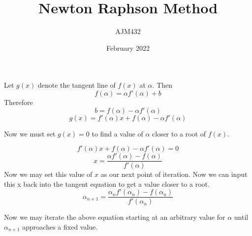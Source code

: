 \documentclass{article}
\title{Newton Raphson Method}
\author{AJM432}
\date{February 2022}
\begin{document}
\maketitle

Let $g(x)$ denote the tangent line of $f(x)$ at $\alpha$.
Then $$f(\alpha) = \alpha f'(\alpha) + b$$
Therefore $$b=f(\alpha)- \alpha f'(\alpha)$$
$$g(x)=f'(\alpha)x + f(\alpha)- \alpha f'(\alpha)$$

Now we must set $g(x)=0$ to find a value of $\alpha$ closer to a root of $f(x)$.

$$f'(\alpha)x + f(\alpha)- \alpha f'(\alpha)=0$$
$$x=\frac{ \alpha f'(\alpha)-f(\alpha)}{f'(\alpha)}$$
Now we may set this value of $x$ as our next point of iteration.
Now we can input this x back into the tangent equation to get a value closer to a root. $$\boxed{\alpha_{n+1}=\frac{ \alpha_n f'(\alpha_n)-f(\alpha_n)}{f'(\alpha_n)}}$$

Now we may iterate the above equation starting at an arbitrary value for $\alpha$ until $\alpha_{n+1}$ approaches a fixed value.
\end{document}
